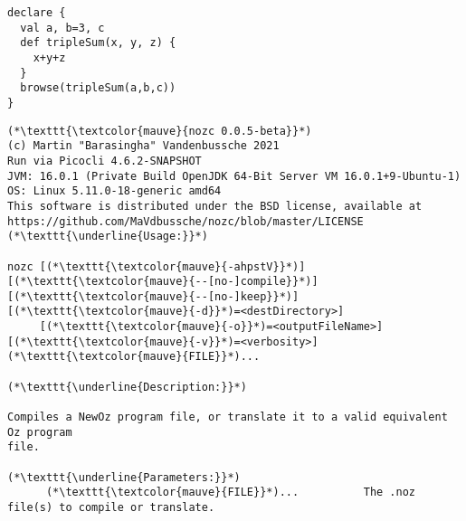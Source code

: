 \begin{lstlisting}[language=newoz,label={lst:compilation-in},title={Input code in \textit{NewOz}}]
declare {
  val a, b=3, c
  def tripleSum(x, y, z) {
    x+y+z
  }
  browse(tripleSum(a,b,c))
}
\end{lstlisting}
\begin{lstlisting}[label={lst:compilation-h},title={Output of the command "\texttt{\$ nozc -h}", showing help regarding the usage of the command}]
(*\texttt{\textcolor{mauve}{nozc 0.0.5-beta}}*)
(c) Martin "Barasingha" Vandenbussche 2021
Run via Picocli 4.6.2-SNAPSHOT
JVM: 16.0.1 (Private Build OpenJDK 64-Bit Server VM 16.0.1+9-Ubuntu-1)
OS: Linux 5.11.0-18-generic amd64
This software is distributed under the BSD license, available at https://github.com/MaVdbussche/nozc/blob/master/LICENSE
(*\texttt{\underline{Usage:}}*)

nozc [(*\texttt{\textcolor{mauve}{-ahpstV}}*)] [(*\texttt{\textcolor{mauve}{--[no-]compile}}*)] [(*\texttt{\textcolor{mauve}{--[no-]keep}}*)] [(*\texttt{\textcolor{mauve}{-d}}*)=<destDirectory>]
     [(*\texttt{\textcolor{mauve}{-o}}*)=<outputFileName>] [(*\texttt{\textcolor{mauve}{-v}}*)=<verbosity>] (*\texttt{\textcolor{mauve}{FILE}}*)...

(*\texttt{\underline{Description:}}*)

Compiles a NewOz program file, or translate it to a valid equivalent Oz program
file.

(*\texttt{\underline{Parameters:}}*)
      (*\texttt{\textcolor{mauve}{FILE}}*)...          The .noz file(s) to compile or translate.


\end{lstlisting}
